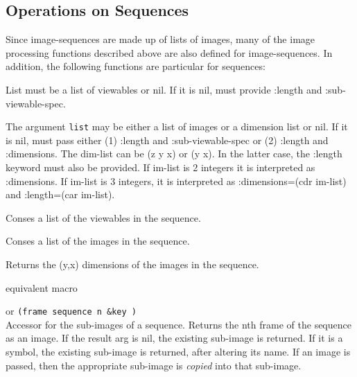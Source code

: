 \subsection{Operations on Sequences}

Since image-sequences are made up of lists of images, many of the
image processing functions described above are also defined for
image-sequences.  In addition, the following functions are particular
for sequences:

\begin{description}
\item{}
List must be a list of viewables or nil.  If it is nil, must provide
:length and :sub-viewable-spec.

\item{}
The argument {\tt list} may be either a list of images or a dimension
list or nil.  If it is nil, must pass either (1) :length and
:sub-viewable-spec or (2) :length and :dimensions.  The dim-list can
be (z y x) or (y x).  In the latter case, the :length keyword must
also be provided.  If im-list is 2 integers it is interpreted as
:dimensions.  If im-list is 3 integers, it is interpreted as
:dimensions=(cdr im-list) and :length=(car im-list).

\item{}
\item{}

\item{}
Conses a list of the viewables in the sequence.
\item{}
Conses a list of the images in the sequence.

\item{}
Returns the (y,x) dimensions of the images in the sequence.
\item{}
\item{}
\item{}
equivalent macro 

\item{}
or {\tt (frame sequence n \&key \res)} \\ 
Accessor for the sub-images of a sequence.  Returns the nth frame of
the sequence as an image.  If the result arg is nil, the existing
sub-image is returned.  If it is a symbol, the existing sub-image is
returned, after altering its name.  If an image is passed, then the
appropriate sub-image is {\em copied} into that sub-image.


\end{description}
